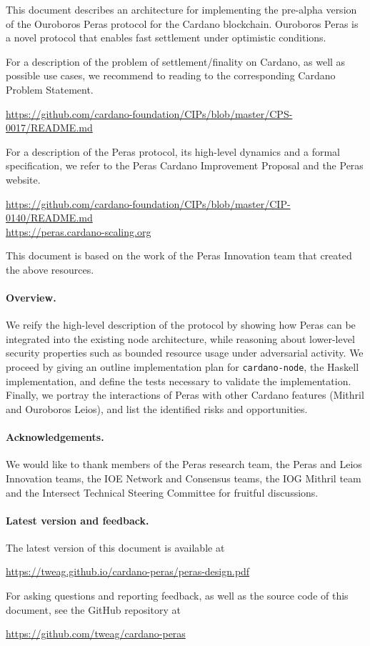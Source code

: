 This document describes an architecture for implementing the pre-alpha version of the Ouroboros Peras protocol for the Cardano blockchain.
Ouroboros Peras is a novel protocol that enables fast settlement under optimistic conditions.

For a description of the problem of settlement/finality on Cardano, as well as possible use cases, we recommend to reading to the corresponding Cardano Problem Statement.
\begin{center}
  \url{https://github.com/cardano-foundation/CIPs/blob/master/CPS-0017/README.md}
\end{center}
For a description of the Peras protocol, its high-level dynamics and a formal specification, we refer to the Peras Cardano Improvement Proposal and the Peras website.
\begin{center}
  \url{https://github.com/cardano-foundation/CIPs/blob/master/CIP-0140/README.md}\\
  \url{https://peras.cardano-scaling.org}
\end{center}
This document is based on the work of the Peras Innovation team that created the above resources.

\paragraph{Overview.}
We reify the high-level description of the protocol by showing how Peras can be integrated into the existing node architecture, while reasoning about lower-level security properties such as bounded resource usage under adversarial activity.
We proceed by giving an outline implementation plan for \texttt{cardano-node}, the Haskell implementation, and define the tests necessary to validate the implementation.
Finally, we portray the interactions of Peras with other Cardano features (Mithril and Ouroboros Leios), and list the identified risks and opportunities.

\paragraph{Acknowledgements.}
We would like to thank members of the Peras research team, the Peras and Leios Innovation teams, the IOE Network and Consensus teams, the IOG Mithril team and the Intersect Technical Steering Committee for fruitful discussions.

\paragraph{Latest version and feedback.}
The latest version of this document is available at
\begin{center}
  \url{https://tweag.github.io/cardano-peras/peras-design.pdf}
\end{center}
For asking questions and reporting feedback, as well as the source code of this document, see the GitHub repository at
\begin{center}
  \url{https://github.com/tweag/cardano-peras}
\end{center}

